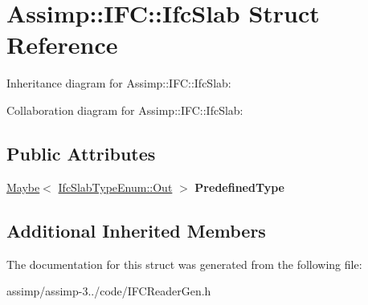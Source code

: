 \hypertarget{struct_assimp_1_1_i_f_c_1_1_ifc_slab}{\section{Assimp\+:\+:I\+F\+C\+:\+:Ifc\+Slab Struct Reference}
\label{struct_assimp_1_1_i_f_c_1_1_ifc_slab}
}


Inheritance diagram for Assimp\+:\+:I\+F\+C\+:\+:Ifc\+Slab\+:


Collaboration diagram for Assimp\+:\+:I\+F\+C\+:\+:Ifc\+Slab\+:
\subsection*{Public Attributes}
\begin{DoxyCompactItemize}
\item 
\hypertarget{struct_assimp_1_1_i_f_c_1_1_ifc_slab_a8cd05666c7b3682daecfda3c4ffd299e}{\hyperlink{struct_assimp_1_1_s_t_e_p_1_1_maybe}{Maybe}$<$ \hyperlink{classboost_1_1shared__ptr}{Ifc\+Slab\+Type\+Enum\+::\+Out} $>$ {\bfseries Predefined\+Type}}\label{struct_assimp_1_1_i_f_c_1_1_ifc_slab_a8cd05666c7b3682daecfda3c4ffd299e}

\end{DoxyCompactItemize}
\subsection*{Additional Inherited Members}


The documentation for this struct was generated from the following file\+:\begin{DoxyCompactItemize}
\item 
assimp/assimp-\/3../code/I\+F\+C\+Reader\+Gen.\+h\end{DoxyCompactItemize}
